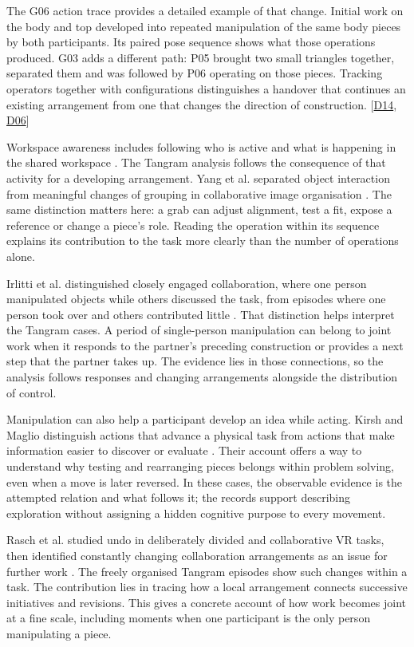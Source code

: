 The G06 action trace provides a detailed example of that change. Initial work on the body and top developed into repeated manipulation of the same body pieces by both participants. Its paired pose sequence shows what those operations produced. G03 adds a different path: P05 brought two small triangles together, separated them and was followed by P06 operating on those pieces. Tracking operators together with configurations distinguishes a handover that continues an existing arrangement from one that changes the direction of construction. [\hyperlink{src:D14}{D14}, \hyperlink{src:D06}{D06}]

Workspace awareness includes following who is active and what is happening in the shared workspace \cite{gutwin2002}. The Tangram analysis follows the consequence of that activity for a developing arrangement. Yang et al. separated object interaction from meaningful changes of grouping in collaborative image organisation \cite{yang2022}. The same distinction matters here: a grab can adjust alignment, test a fit, expose a reference or change a piece's role. Reading the operation within its sequence explains its contribution to the task more clearly than the number of operations alone.

Irlitti et al. distinguished closely engaged collaboration, where one person manipulated objects while others discussed the task, from episodes where one person took over and others contributed little \cite{irlitti2024}. That distinction helps interpret the Tangram cases. A period of single-person manipulation can belong to joint work when it responds to the partner's preceding construction or provides a next step that the partner takes up. The evidence lies in those connections, so the analysis follows responses and changing arrangements alongside the distribution of control.

Manipulation can also help a participant develop an idea while acting. Kirsh and Maglio distinguish actions that advance a physical task from actions that make information easier to discover or evaluate \cite{kirsh1994}. Their account offers a way to understand why testing and rearranging pieces belongs within problem solving, even when a move is later reversed. In these cases, the observable evidence is the attempted relation and what follows it; the records support describing exploration without assigning a hidden cognitive purpose to every movement.

Rasch et al. studied undo in deliberately divided and collaborative VR tasks, then identified constantly changing collaboration arrangements as an issue for further work \cite{rasch2024}. The freely organised Tangram episodes show such changes within a task. The contribution lies in tracing how a local arrangement connects successive initiatives and revisions. This gives a concrete account of how work becomes joint at a fine scale, including moments when one participant is the only person manipulating a piece.


